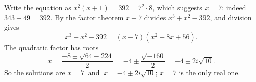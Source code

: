 Write the equation as $x^2(x+1)=392=7^2\cdot8$, which suggests $x=7$: indeed $343+49=392$. By the factor theorem $x-7$ divides $x^3+x^2-392$, and division gives
\[x^3+x^2-392=(x-7)\left(x^2+8x+56\right).\]
The quadratic factor has roots
\[x=\dfrac{-8\pm\sqrt{64-224}}{2}=-4\pm\dfrac{\sqrt{-160}}{2}=-4\pm2i\sqrt{10}.\]
So the solutions are $\boxed{x=7\ \text{ and }\ x=-4\pm2i\sqrt{10}}$; $x=7$ is the only real one.
